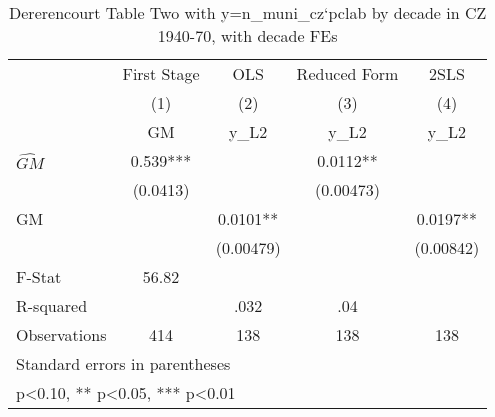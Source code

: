 \begin{table}[htbp]\centering
\def\sym#1{\ifmmode^{#1}\else\(^{#1}\)\fi}
\caption{Dererencourt Table Two with y=n\_muni\_cz`pclab by decade in CZ 1940-70, with decade FEs}
\begin{tabular}{l*{4}{c}}
\toprule
                    & First Stage   &         OLS   &Reduced Form   &        2SLS   \\
                    &\multicolumn{1}{c}{(1)}&\multicolumn{1}{c}{(2)}&\multicolumn{1}{c}{(3)}&\multicolumn{1}{c}{(4)}\\
                    &\multicolumn{1}{c}{GM}&\multicolumn{1}{c}{y\_L2}&\multicolumn{1}{c}{y\_L2}&\multicolumn{1}{c}{y\_L2}\\
\midrule
$\hat{GM}$          &       0.539***&               &      0.0112** &               \\
                    &    (0.0413)   &               &   (0.00473)   &               \\
\addlinespace
GM                  &               &      0.0101** &               &      0.0197** \\
                    &               &   (0.00479)   &               &   (0.00842)   \\
\midrule
F-Stat              &       56.82   &               &               &               \\
R-squared           &               &        .032   &         .04   &               \\
Observations        &         414   &         138   &         138   &         138   \\
\bottomrule
\multicolumn{5}{l}{\footnotesize Standard errors in parentheses}\\
\multicolumn{5}{l}{\footnotesize * p<0.10, ** p<0.05, *** p<0.01}\\
\end{tabular}
\end{table}
